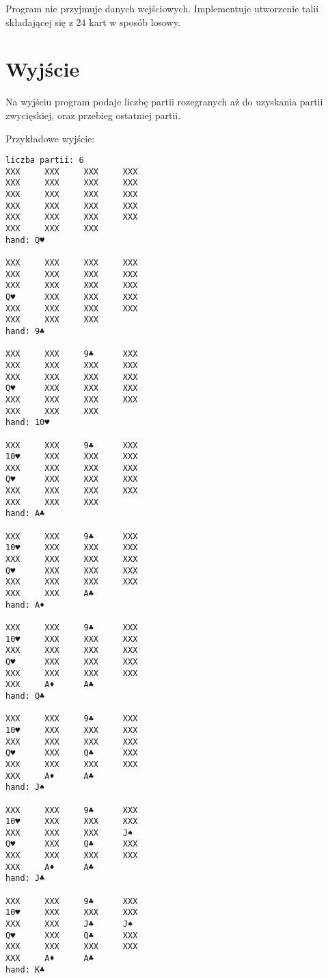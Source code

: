 \documentclass{article}
\begin{document}
Program nie przyjmuje danych wejściowych. Implementuje utworzenie talii składającej się z 24 kart w sposób losowy.

\section{Wyjście}

Na wyjściu program podaje liczbę partii rozegranych aż do uzyskania partii zwycięskiej, oraz przebieg ostatniej partii.

Przykładowe wyjście:

\setlength{\columnsep}{1.2cm}
\setlength{\columnseprule}{1pt}
\def\columnseprulecolor{\color{black}}
\begin{multicols}{2}
\begin{verbatim}
liczba partii: 6
XXX     XXX     XXX     XXX
XXX     XXX     XXX     XXX
XXX     XXX     XXX     XXX
XXX     XXX     XXX     XXX
XXX     XXX     XXX     XXX
XXX     XXX     XXX
hand: Q♥

XXX     XXX     XXX     XXX
XXX     XXX     XXX     XXX
XXX     XXX     XXX     XXX
Q♥      XXX     XXX     XXX
XXX     XXX     XXX     XXX
XXX     XXX     XXX
hand: 9♣

XXX     XXX     9♣      XXX
XXX     XXX     XXX     XXX
XXX     XXX     XXX     XXX
Q♥      XXX     XXX     XXX
XXX     XXX     XXX     XXX
XXX     XXX     XXX
hand: 10♥

XXX     XXX     9♣      XXX
10♥     XXX     XXX     XXX
XXX     XXX     XXX     XXX
Q♥      XXX     XXX     XXX
XXX     XXX     XXX     XXX
XXX     XXX     XXX
hand: A♣

XXX     XXX     9♣      XXX
10♥     XXX     XXX     XXX
XXX     XXX     XXX     XXX
Q♥      XXX     XXX     XXX
XXX     XXX     XXX     XXX
XXX     XXX     A♣
hand: A♦

XXX     XXX     9♣      XXX
10♥     XXX     XXX     XXX
XXX     XXX     XXX     XXX
Q♥      XXX     XXX     XXX
XXX     XXX     XXX     XXX
XXX     A♦      A♣
hand: Q♣

XXX     XXX     9♣      XXX
10♥     XXX     XXX     XXX
XXX     XXX     XXX     XXX
Q♥      XXX     Q♣      XXX
XXX     XXX     XXX     XXX
XXX     A♦      A♣
hand: J♠

XXX     XXX     9♣      XXX
10♥     XXX     XXX     XXX
XXX     XXX     XXX     J♠
Q♥      XXX     Q♣      XXX
XXX     XXX     XXX     XXX
XXX     A♦      A♣
hand: J♣

XXX     XXX     9♣      XXX
10♥     XXX     XXX     XXX
XXX     XXX     J♣      J♠
Q♥      XXX     Q♣      XXX
XXX     XXX     XXX     XXX
XXX     A♦      A♣
hand: K♣


\end{verbatim}
\end{multicols}
\end{document}

